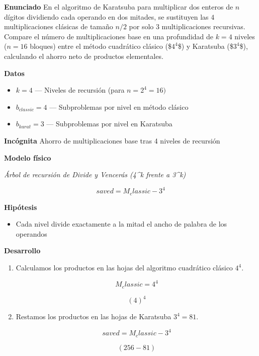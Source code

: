 \documentclass{book}
\begin{document}
\begin{tcolorbox}[title={Problema resuelto}, studiumworked, breakable]

\noindent\textbf{Enunciado}
En el algoritmo de Karatsuba para multiplicar dos enteros de \(n\) dígitos dividiendo cada operando en dos mitades, se sustituyen las \(4\) multiplicaciones clásicas de tamaño \(n/2\) por solo \(3\) multiplicaciones recursivas. Compare el número de multiplicaciones base en una profundidad de \(k = 4\) niveles (\(n = 16\) bloques) entre el método cuadrático clásico (\$\(4^4\)\$) y Karatsuba (\$\(3^4\)\$), calculando el ahorro neto de productos elementales.

\noindent\textbf{Datos}
\begin{itemize}
\item $k = 4$ — Niveles de recursión (para \(n = 2^4 = 16)\)
\item $b_{classic} = 4$ — Subproblemas por nivel en método clásico
\item $b_{karat} = 3$ — Subproblemas por nivel en Karatsuba
\end{itemize}

\noindent\textbf{Incógnita}
Ahorro de multiplicaciones base tras 4 niveles de recursión

\noindent\textbf{Modelo físico}

\noindent\textit{Árbol de recursión de Divide y Vencerás (4\textasciicircum{}k frente a 3\textasciicircum{}k)}

\[
saved = M_classic - 3^4
\]

\noindent\textbf{Hipótesis}
\begin{itemize}
\item Cada nivel divide exactamente a la mitad el ancho de palabra de los operandos
\end{itemize}

\noindent\textbf{Desarrollo}
\begin{enumerate}
\item
Calculamos los productos en las hojas del algoritmo cuadrático clásico \(4^4\).

\[
M_classic = 4^4
\]

\[
\left(4\right)^{4}
\]
\item
Restamos los productos en las hojas de Karatsuba \(3^4 = 81\).

\[
saved = M_classic - 3^4
\]

\[
\left(256-81\right)
\]
\end{enumerate}


\end{tcolorbox}
\end{document}
